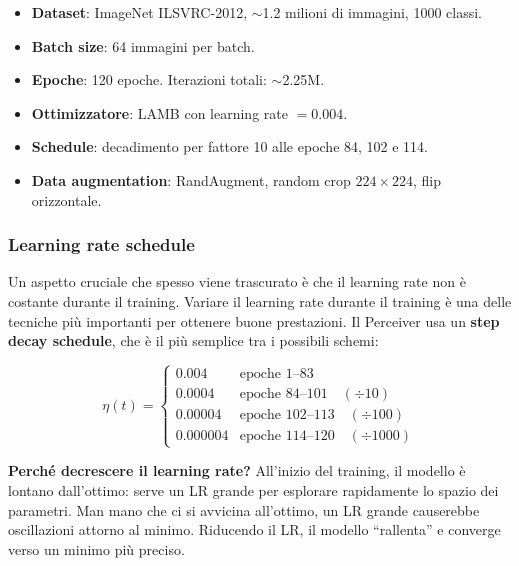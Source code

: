 \documentclass[12pt,a4paper]{article}
\begin{document}
\begin{formulabox}
\begin{itemize}
    \item \textbf{Dataset}: ImageNet ILSVRC-2012, $\sim$1.2 milioni di immagini, 1000 classi.
    \item \textbf{Batch size}: 64 immagini per batch.
    \item \textbf{Epoche}: 120 epoche. Iterazioni totali: $\sim$2.25M.
    \item \textbf{Ottimizzatore}: LAMB con learning rate $= 0.004$.
    \item \textbf{Schedule}: decadimento per fattore 10 alle epoche 84, 102 e 114.
    \item \textbf{Data augmentation}: RandAugment, random crop $224 \times 224$, flip orizzontale.
\end{itemize}
\end{formulabox}

\subsubsection{Learning rate schedule} \label{sec:lr_schedule}

Un aspetto cruciale che spesso viene trascurato \`e che il learning rate non \`e costante durante il training. Variare il learning rate durante il training \`e una delle tecniche pi\`u importanti per ottenere buone prestazioni. Il Perceiver usa un \textbf{step decay schedule}, che \`e il pi\`u semplice tra i possibili schemi:

\begin{formulabox}
\[
    \eta(t) = \begin{cases}
        0.004 & \text{epoche } 1\text{--}83 \\
        0.0004 & \text{epoche } 84\text{--}101 \quad (\div 10) \\
        0.00004 & \text{epoche } 102\text{--}113 \quad (\div 100) \\
        0.000004 & \text{epoche } 114\text{--}120 \quad (\div 1000)
    \end{cases}
\]
\end{formulabox}

\textbf{Perch\'e decrescere il learning rate?} All'inizio del training, il modello \`e lontano dall'ottimo: serve un LR grande per esplorare rapidamente lo spazio dei parametri. Man mano che ci si avvicina all'ottimo, un LR grande causerebbe oscillazioni attorno al minimo. Riducendo il LR, il modello ``rallenta'' e converge verso un minimo pi\`u preciso.
\end{document}
